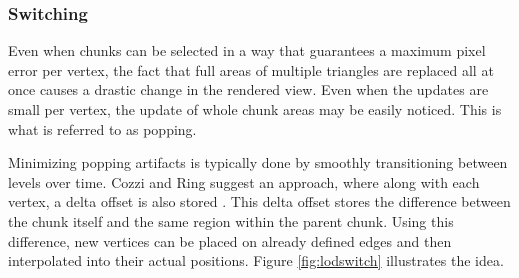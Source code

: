 \subsubsection{Switching}

Even when chunks can be selected in a way that guarantees a maximum pixel error per vertex, the fact that full areas of multiple triangles are replaced all at once causes a drastic change in the rendered view. Even when the updates are small per vertex, the update of whole chunk areas may be easily noticed. This is what is referred to as popping.

Minimizing popping artifacts is typically done by smoothly transitioning between levels over time. Cozzi and Ring suggest an approach, where along with each vertex, a delta offset is also stored \cite[p. 451]{cozzi11}. This delta offset stores the difference between the chunk itself and the same region within the parent chunk. Using this difference, new vertices can be placed on already defined edges and then interpolated into their actual positions. Figure \ref{fig:lodswitch} illustrates the idea.

